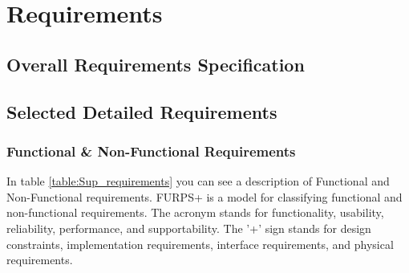 \section{Requirements}

\subsection{Overall Requirements Specification}

\subsection{Selected Detailed Requirements}

\subsubsection{Functional \& Non-Functional Requirements}
In table \ref{table:Sup_requirements} you can see a description of Functional and
Non-Functional requirements. 
FURPS+ is a model for classifying functional and non-functional requirements.
The acronym stands for functionality, usability, reliability, performance, and supportability.
The '+' sign stands for design constraints, implementation requirements,
interface requirements, and physical requirements.


